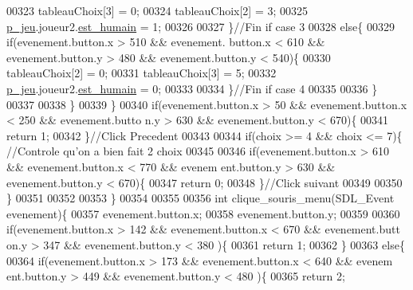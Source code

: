 \begin{DoxyCode}
00323                                 tableauChoix[3] = 0;
00324                                 tableauChoix[2] = 3;
00325                                 \hyperlink{moteur_8h_a3efa8d0f7c65daedc584dc8db048e62c}{p_jeu}.joueur2.\hyperlink{structjoueur_a9419778626112832ee0e59df49145a39}{est_humain} = 1;
00326 
00327                                 \}\textcolor{comment}{//Fin if case 3}
00328                                 \textcolor{keywordflow}{else}\{
00329                                         \textcolor{keywordflow}{if}(evenement.button.x > 510 && evenement.
      button.x < 610 && evenement.button.y > 480 && evenement.button.y < 540)\{
00330                                                 tableauChoix[2] = 0;
00331                                                 tableauChoix[3] = 5;
00332                                                 \hyperlink{moteur_8h_a3efa8d0f7c65daedc584dc8db048e62c}{p_jeu}.joueur2.\hyperlink{structjoueur_a9419778626112832ee0e59df49145a39}{est_humain} = 0;
00333 
00334                                         \}\textcolor{comment}{//Fin if case 4}
00335 
00336                                 \}
00337 
00338                 \}
00339         \}
00340         \textcolor{keywordflow}{if}(evenement.button.x > 50 && evenement.button.x < 250 && evenement.butto
      n.y > 630 && evenement.button.y < 670)\{
00341                 \textcolor{keywordflow}{return} 1;
00342         \}\textcolor{comment}{//Click Precedent}
00343 
00344         \textcolor{keywordflow}{if}(choix >= 4 && choix <= 7)\{ \textcolor{comment}{//Controle qu'on a bien fait 2 choix}
00345 
00346                 \textcolor{keywordflow}{if}(evenement.button.x > 610 && evenement.button.x < 770 && evenem
      ent.button.y > 630 && evenement.button.y < 670)\{
00347                         \textcolor{keywordflow}{return} 0;
00348                 \}\textcolor{comment}{//Click suivant}
00349 
00350         \}
00351 
00352 
00353 \}
00354 
00355 
00356 \textcolor{keywordtype}{int} clique\_souris\_menu(SDL\_Event evenement)\{
00357         evenement.button.x;
00358         evenement.button.y;
00359 
00360         \textcolor{keywordflow}{if}(evenement.button.x > 142 && evenement.button.x < 670 && evenement.butt
      on.y > 347 && evenement.button.y < 380 )\{
00361                 \textcolor{keywordflow}{return} 1;
00362         \}
00363         \textcolor{keywordflow}{else}\{
00364                 \textcolor{keywordflow}{if}(evenement.button.x > 173 && evenement.button.x < 640 && evenem
      ent.button.y > 449 && evenement.button.y < 480 )\{
00365                         \textcolor{keywordflow}{return} 2;

\end{DoxyCode}
